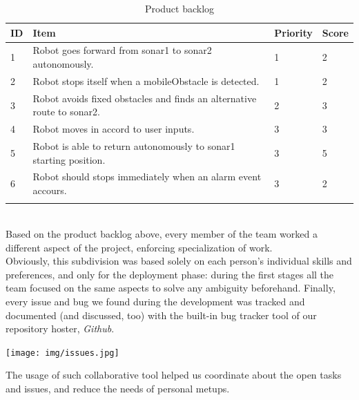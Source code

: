 \documentclass{llncs}
\begin{document}
\begin{table}[]
\centering
\label{my-label}
\begin{tabular}{llll}
\hline
\multicolumn{1}{|l|}{\textbf{ID}} & \multicolumn{1}{l|}{\textbf{Item}}                                                        & \multicolumn{1}{l|}{\textbf{Priority}} & \multicolumn{1}{l|}{\textbf{Score}} \\ \hline
\multicolumn{1}{|l|}{1}           & \multicolumn{1}{l|}{Robot goes forward from sonar1 to sonar2 autonomously.} & \multicolumn{1}{l|}{1}                 & \multicolumn{1}{l|}{2}              
\\ \hline
\multicolumn{1}{|l|}{2}           & \multicolumn{1}{l|}{Robot stops itself when a mobileObstacle is detected.} & \multicolumn{1}{l|}{1}                 & \multicolumn{1}{l|}{2}              
\\ \hline
\multicolumn{1}{|l|}{3}           & \multicolumn{1}{l|}{Robot avoids fixed obstacles and finds an alternative route to sonar2.} & \multicolumn{1}{l|}{2}                 & \multicolumn{1}{l|}{3}              
\\ \hline
\multicolumn{1}{|l|}{4}           & \multicolumn{1}{l|}{Robot moves in accord to user inputs.} & \multicolumn{1}{l|}{3}                 & \multicolumn{1}{l|}{3}              
\\ \hline
\multicolumn{1}{|l|}{5}           & \multicolumn{1}{l|}{Robot is able to return autonomously to sonar1 starting position.} & \multicolumn{1}{l|}{3}                 & \multicolumn{1}{l|}{5}              
\\ \hline
\multicolumn{1}{|l|}{6}           & \multicolumn{1}{l|}{Robot should stops immediately when an alarm event accours.} & \multicolumn{1}{l|}{3}                 & \multicolumn{1}{l|}{2}              
\\ \hline
                                  &                                                                                           &                                        &                                    
\end{tabular}
\caption{Product backlog}
\end{table}\\
Based on the product backlog above, every member of the team worked a different aspect of the project, enforcing specialization of work.\\
Obviously, this subdivision was based solely on each person's individual skills and preferences, and only for the deployment phase: during the first stages all the team focused on the same aspects to solve any ambiguity beforehand.
\newpage
Finally, every issue and bug we found during the development was tracked and documented (and discussed, too) with the built-in bug tracker tool of our repository hoster, \textit{Github}.
\begin{center}
\texttt{[image: img/issues.jpg]}    
\end{center}
The usage of such collaborative tool helped us coordinate about the open tasks and issues, and reduce the needs of personal metups.
\newpage
\end{document}
